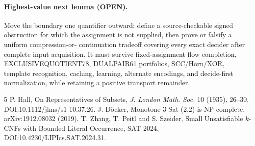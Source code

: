 \documentclass[11pt]{article}
\begin{document}
\paragraph{Highest-value next lemma (OPEN).}
Move the boundary one quantifier outward: define a source-checkable signed obstruction for
which the assignment is not supplied, then prove or falsify a uniform compression-or-
continuation tradeoff covering every exact decider after complete input acquisition.  It
must survive fixed-assignment flow completion, EXCLUSIVEQUOTIENT78, DUALPAIR61 portfolios,
SCC/Horn/XOR, template recognition, caching, learning, alternate encodings, and decide-first
normalization, while retaining a positive transport remainder.

\begin{thebibliography}{5}
 P. Hall, On Representatives of Subsets, \emph{J. London Math. Soc.}
10 (1935), 26--30, DOI:10.1112/jlms/s1-10.37.26.
 J. D\"ocker, Monotone 3-Sat-(2,2) is NP-complete,
arXiv:1912.08032 (2019).
 T. Zhang, T. Peitl and S. Szeider, Small Unsatisfiable $k$-CNFs
with Bounded Literal Occurrence, SAT 2024, DOI:10.4230/LIPIcs.SAT.2024.31.
\end{thebibliography}
\end{document}

